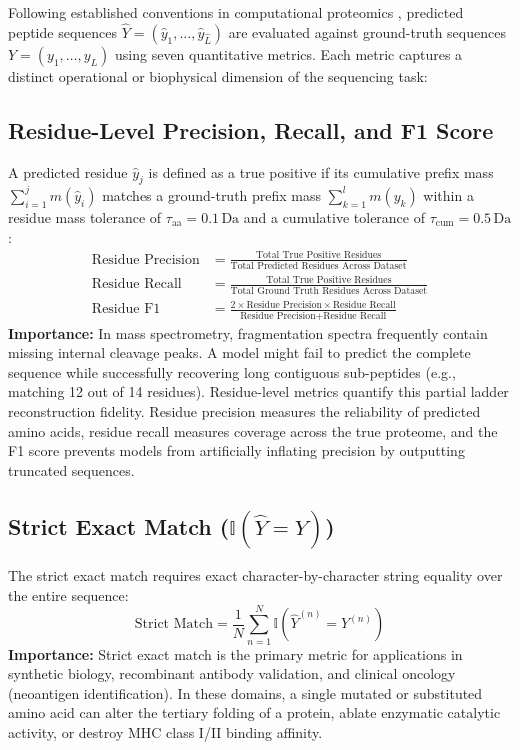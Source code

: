 Following established conventions in computational proteomics \citep{Tran2017, Yilmaz2022, Eloff2025}, predicted peptide sequences $\hat{Y} = (\hat{y}_1, \dots, \hat{y}_{\hat{L}})$ are evaluated against ground-truth sequences $Y = (y_1, \dots, y_L)$ using seven quantitative metrics. Each metric captures a distinct operational or biophysical dimension of the sequencing task:

\subsection{Residue-Level Precision, Recall, and F1 Score}

A predicted residue $\hat{y}_j$ is defined as a true positive if its cumulative prefix mass $\sum_{i=1}^j m(\hat{y}_i)$ matches a ground-truth prefix mass $\sum_{k=1}^l m(y_k)$ within a residue mass tolerance of $\tau_{\text{aa}} = 0.1\,\text{Da}$ and a cumulative tolerance of $\tau_{\text{cum}} = 0.5\,\text{Da}$ \citep{Tran2017}:
\begin{align}
\text{Residue Precision} &= \frac{\text{Total True Positive Residues}}{\text{Total Predicted Residues Across Dataset}} \label{eq:aa_precision} \\
\text{Residue Recall} &= \frac{\text{Total True Positive Residues}}{\text{Total Ground Truth Residues Across Dataset}} \label{eq:aa_recall} \\
\text{Residue F1} &= \frac{2 \times \text{Residue Precision} \times \text{Residue Recall}}{\text{Residue Precision} + \text{Residue Recall}} \label{eq:aa_f1}
\end{align}
\textbf{Importance:} In mass spectrometry, fragmentation spectra frequently contain missing internal cleavage peaks. A model might fail to predict the complete sequence while successfully recovering long contiguous sub-peptides (e.g., matching 12 out of 14 residues). Residue-level metrics quantify this partial ladder reconstruction fidelity. Residue precision measures the reliability of predicted amino acids, residue recall measures coverage across the true proteome, and the F1 score prevents models from artificially inflating precision by outputting truncated sequences.

\subsection{Strict Exact Match ($\mathbb{I}(\hat{Y} = Y)$)}

The strict exact match requires exact character-by-character string equality over the entire sequence:
\begin{equation}
\text{Strict Match} = \frac{1}{N} \sum_{n=1}^N \mathbb{I}(\hat{Y}^{(n)} = Y^{(n)})
\label{eq:strict_match}
\end{equation}
\textbf{Importance:} Strict exact match is the primary metric for applications in synthetic biology, recombinant antibody validation, and clinical oncology (neoantigen identification). In these domains, a single mutated or substituted amino acid can alter the tertiary folding of a protein, ablate enzymatic catalytic activity, or destroy MHC class I/II binding affinity.

